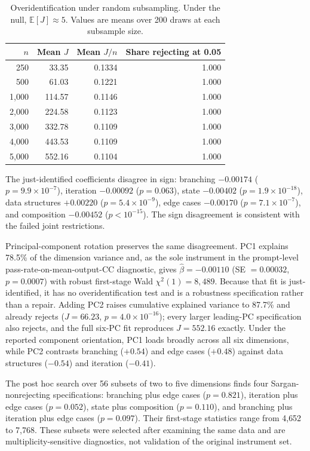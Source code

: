 \documentclass{article}
\begin{document}
\begin{table}[h]
\centering
\caption{Overidentification under random subsampling. Under the null, $\mathbb{E}[J]\approx5$. Values are means over 200 draws at each subsample size.}
\label{tab:overid-subsamples}
\begin{tabular}{@{}rrrr@{}}
\toprule
$n$ & Mean $J$ & Mean $J/n$ & Share rejecting at 0.05 \\
\midrule
250   & 33.35  & 0.1334 & 1.000 \\
500   & 61.03  & 0.1221 & 1.000 \\
1{,}000 & 114.57 & 0.1146 & 1.000 \\
2{,}000 & 224.58 & 0.1123 & 1.000 \\
3{,}000 & 332.78 & 0.1109 & 1.000 \\
4{,}000 & 443.53 & 0.1109 & 1.000 \\
5{,}000 & 552.16 & 0.1104 & 1.000 \\
\bottomrule
\end{tabular}
\end{table}

The just-identified coefficients disagree in sign: branching $-0.00174$ ($p=9.9\times10^{-7}$), iteration $-0.00092$ ($p=0.063$), state $-0.00402$ ($p=1.9\times10^{-18}$), data structures $+0.00220$ ($p=5.4\times10^{-9}$), edge cases $-0.00170$ ($p=7.1\times10^{-7}$), and composition $-0.00452$ ($p<10^{-15}$). The sign disagreement is consistent with the failed joint restrictions.

Principal-component rotation preserves the same disagreement. PC1 explains 78.5\% of the dimension variance and, as the sole instrument in the prompt-level pass-rate-on-mean-output-CC diagnostic, gives $\hat{\beta}=-0.00110$ (SE $=0.00032$, $p=0.0007$) with robust first-stage Wald $\chi^2(1)=8{,}489$. Because that fit is just-identified, it has no overidentification test and is a robustness specification rather than a repair. Adding PC2 raises cumulative explained variance to 87.7\% and already rejects ($J=66.23$, $p=4.0\times10^{-16}$); every larger leading-PC specification also rejects, and the full six-PC fit reproduces $J=552.16$ exactly. Under the reported component orientation, PC1 loads broadly across all six dimensions, while PC2 contrasts branching ($+0.54$) and edge cases ($+0.48$) against data structures ($-0.54$) and iteration ($-0.41$).

The post hoc search over 56 subsets of two to five dimensions finds four Sargan-nonrejecting specifications: branching plus edge cases ($p=0.821$), iteration plus edge cases ($p=0.052$), state plus composition ($p=0.110$), and branching plus iteration plus edge cases ($p=0.097$). Their first-stage statistics range from 4{,}652 to 7{,}768. These subsets were selected after examining the same data and are multiplicity-sensitive diagnostics, not validation of the original instrument set.
\end{document}

